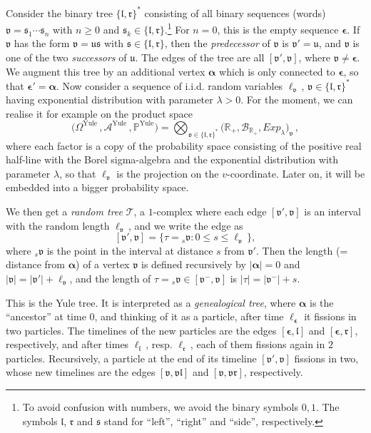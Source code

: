 \documentclass[12pt]{amsart}
\newcommand\A{\mathcal A}
\newcommand\bal{\boldsymbol{\alpha}}
\newcommand\bep{\boldsymbol{\epsilon}}
\newcommand\Bor{\mathcal B}
\newcommand\Exp{\textit{Exp}}
\newcommand\lt{\mathfrak{l}}
\newcommand\Prob{\mathbb P}
\newcommand\R{\mathbb R}
\newcommand\rt{\mathfrak{r}}
\newcommand\sd{\mathfrak{s}}
\newcommand\T{\mathcal T}
\newcommand\ut{\mathfrak{u}}
\newcommand\vt{\mathfrak{v}}
\numberwithin{theorem}{section}
\theoremstyle{definition}
\begin{document}
Consider the binary tree $\{\lt,\rt\}^*$ consisting of all binary sequences
(words) $\vt = \sd_1\cdots \sd_n$ with $n \ge 0$ and $\sd_k \in \{\lt,\rt\}$.\footnote{To 
avoid confusion with numbers, we avoid the binary symbols $0, 1$. The symbols $\lt$, $\rt$ 
and $\sd$ stand for ``left'', ``right'' and ``side'', respectively.} 
For $n=0$, this is the empty sequence $\bep$. 
If $\vt$ has the form $\vt=\ut\sd$ with $\sd \in \{\lt,\rt\}$, then the \emph{predecessor} of 
$\vt$ is $\vt'=\ut$, and $\vt$ is one of the two \emph{successors} of $\ut$. The 
edges of the tree are all $[\vt',\vt]$, where $\vt \ne \bep$. We augment this tree 
by an additional vertex $\bal$ which is only connected to $\bep$, so that
$\bep' = \bal$. %
Now consider a sequence of i.i.d. random variables $\ell_{\vt}\,$, $\vt \in \{\lt,\rt\}^*$
having exponential distribution with parameter $\lambda > 0$. 
For the moment, we can realise it for example on the  product space 
$$
\bigl(\Omega^{\text{Yule}}\,, \A^{\text{Yule}}\,,\Prob^{\text{Yule}}\bigr) 
= \bigotimes_{\vt \in \{\lt,\rt\}^*} 
\bigl( \R_+, \Bor_{\R_+}, \Exp_{\lambda}\bigr)_{\vt}\,,
$$
where each factor is a copy of the probability space consisting of the 
positive real half-line with the Borel sigma-algebra and the exponential 
distribution with parameter $\lambda$, so that $\ell_{\vt}$ is the projection
on the $v$-coordinate. Later on, it will be embedded into a bigger probability
space.

We then get a \emph{random tree} $\T$, a $1$-complex where each edge $[\vt',\vt]$ is 
an interval with the random length $\ell_{\vt}\,$, and we write the edge as 
\begin{equation}\label{eq:edge}
[\vt',\vt] = \{\tau = {{_s}\vt} : 0 \le s \le \ell_{\vt}\,\},
\end{equation}
where ${{_s}\vt}$ is the point in the interval
at distance $s$ from $\vt'$. Then the length (= distance from $\bal$) of a vertex 
$\vt$ is defined recursively by $|\bal|=0$ and $|\vt| = |\vt'| + \ell_{\vt}$, and the length of 
$\tau = {{_s}\vt} \in  [\vt^-,\vt]$ is $|\tau| = |\vt^-| + s$.

This is the Yule tree. It is interpreted as a \emph{genealogical tree}, where $\bal$
is the ``ancestor'' at time $0$, and thinking of it as a particle, after time 
$\ell_{\bep}$ it fissions in two particles. The timelines of the new particles
are the edges $[\bep,\lt]$ and $[\bep,\rt]$, respectively, and after times $\ell_{\lt}\,$,
resp. $\ell_{\rt}\,$, each of them fissions again in $2$ particles. Recursively, a particle
at the end of its timeline $[\vt',\vt]$ fissions in two, whose new timelines are the edges
$[\vt,\vt\lt]$ and $[\vt,\vt\rt]$, respectively.
\end{document}
